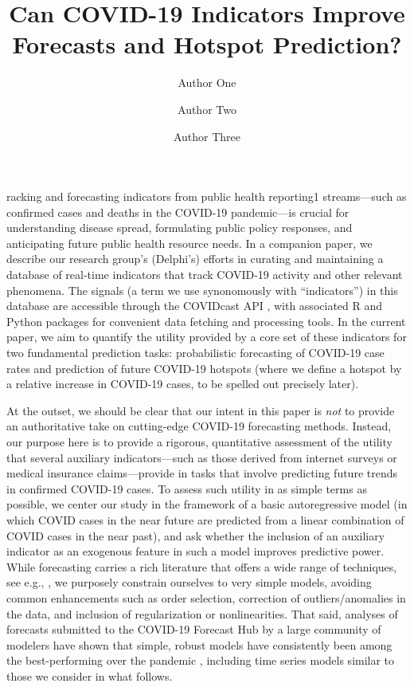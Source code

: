 \documentclass[9pt,twocolumn,twoside,lineno]{pnas-new}
\title{Can COVID-19 Indicators Improve Forecasts and Hotspot Prediction?}
\author[a,c,1]{Author One}
\author[b,1,2]{Author Two}
\author[a]{Author Three}
\affil[a]{Affiliation One}
\affil[b]{Affiliation Two}
\affil[c]{Affiliation Three}
\begin{document}
\maketitle
\thispagestyle{firststyle}

racking and forecasting indicators from public health reporting1
streams---such as confirmed cases and deaths in the COVID-19 pandemic---is
crucial for understanding disease spread, formulating public policy responses,
and anticipating future public health resource needs.  In a companion paper, we
describe our research group's (Delphi's) efforts in curating and maintaining a 
database of real-time indicators that track COVID-19 activity and other relevant
phenomena. The signals (a term we use synonomously with ``indicators'') in this
database are accessible through the COVIDcast API \cite{CovidcastAPI}, with
associated R \cite{CovidcastR} and Python \cite{CovidcastPy} packages for
convenient data fetching and processing tools. In the current paper, we aim to
quantify the utility provided by a core set of these indicators for two
fundamental prediction tasks: probabilistic forecasting of COVID-19 case 
rates and prediction of future COVID-19 hotspots (where we define a hotspot by a
relative increase in COVID-19 cases, to be spelled out precisely later). 

At the outset, we should be clear that our intent in this paper is \emph{not} to
provide an authoritative take on cutting-edge COVID-19 forecasting methods.
Instead, our purpose here is to provide a rigorous, quantitative assessment of
the utility that several auxiliary indicators---such as those derived from
internet surveys or medical insurance claims---provide in tasks that involve
predicting future trends in confirmed COVID-19 cases. To assess such utility in
as simple terms as possible, we center our study in the framework of a basic
autoregressive model (in which COVID cases in the near future are predicted from  
a linear combination of COVID cases in the near past), and ask whether the 
inclusion of an auxiliary indicator as an exogenous feature in such a model
improves predictive power. While forecasting carries a rich literature that
offers a wide range of techniques, see e.g., \cite{Hyndman:2018}, we purposely
constrain ourselves to very simple models, avoiding common enhancements such as
order selection, correction of outliers/anomalies in the data, and inclusion of
regularization or nonlinearities. That said, analyses of forecasts submitted to
the COVID-19 Forecast Hub \cite{ForecastHub} by a large community of modelers
have shown that simple, robust models have consistently been among the
best-performing over the pandemic \cite{Cramer:2021}, including time series
models similar to those we consider in what follows.  
\end{document}
